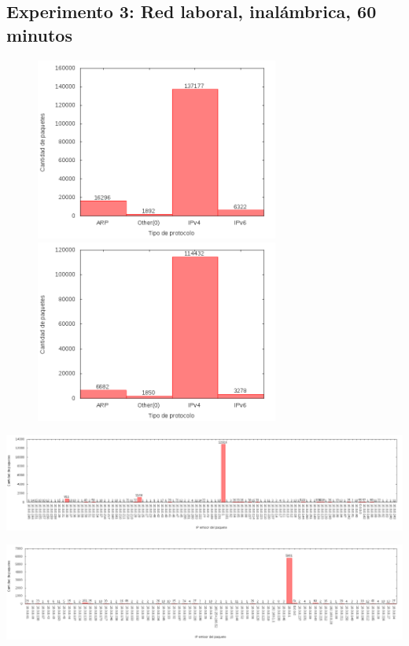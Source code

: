 \subsection{Experimento 3: Red laboral, inalámbrica, 60 minutos}

\begin{figure}[!h]
\centering
\begin{minipage}{8cm}
  \centering
  \includegraphics[width=8cm]{../mediciones/job1/type.png}
\end{minipage}%
\begin{minipage}{8cm}
  \centering
  \includegraphics[width=8cm]{../mediciones/job2/type.png}
\end{minipage}
\end{figure}

\begin{center}
\includegraphics[width=16cm]{../mediciones/job1/src.png}
\end{center}

\begin{center}
\includegraphics[width=16cm]{../mediciones/job2/src.png}
\end{center}

